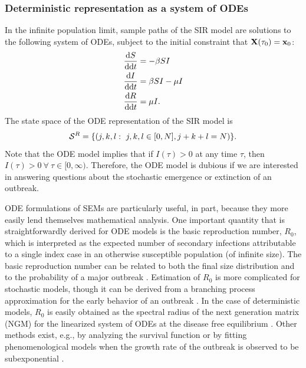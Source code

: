 \subsubsection{Deterministic representation as a system of ODEs}
\label{subsec:deterministic_models}

In the infinite population limit, sample paths of the SIR model are solutions to the following system of ODEs, subject to the initial constraint that $ \mathbf{X}(\tau_0) = \mathbf{x}_0 $:
\begin{align*}
\frac{\mathrm{d} S}{\mathrm{d}\mathrm{d} t} &= -\beta S I \\
\frac{\mathrm{d} I}{\mathrm{d}\mathrm{d} t} &= \beta S I - \mu I \\
\frac{\mathrm{d} R}{\mathrm{d}\mathrm{d} t} &= \mu I.
\end{align*}
The state space of the ODE representation of the SIR model is $$ \mcS^R =  \lbrace(j,k,l:\ j,k,l\in[0,N], j+k+l = N)\rbrace. $$ Note that the ODE model implies that if $ I(\tau) > 0 $ at any time $ \tau $, then $ I(\tau) > 0\ \forall\ \tau\in[0,\infty)$. Therefore, the ODE model is dubious if we are interested in answering questions about the stochastic emergence or extinction of an outbreak.

ODE formulations of SEMs are particularly useful, in part, because they more easily lend themselves mathematical analysis. One important quantity that is straightforwardly derived for ODE models is the basic reproduction number, $ R_0 $, which is interpreted as the expected number of secondary infections attributable to a single index case in an otherwise susceptible population (of infinite size). The basic reproduction number can be related to both the final size distribution and to the probability of a major outbreak \cite{allen2017primer,miller2012note}. Estimation of $ R_0 $ is more complicated for stochastic models, though it can be derived from a branching process approximation for the early behavior of an outbreak \cite{allen2008introduction}. In the case of deterministic models, $ R_0 $ is easily obtained as the spectral radius of the next generation matrix (NGM) for the linearized system of ODEs at the disease free equilibrium \cite{diekmann2009construction,van2017reproduction}. Other methods exist, e.g., by analyzing the survival function or by fitting phenomenological models when the growth rate of the outbreak is observed to be subexponential \cite{van2017reproduction}.

